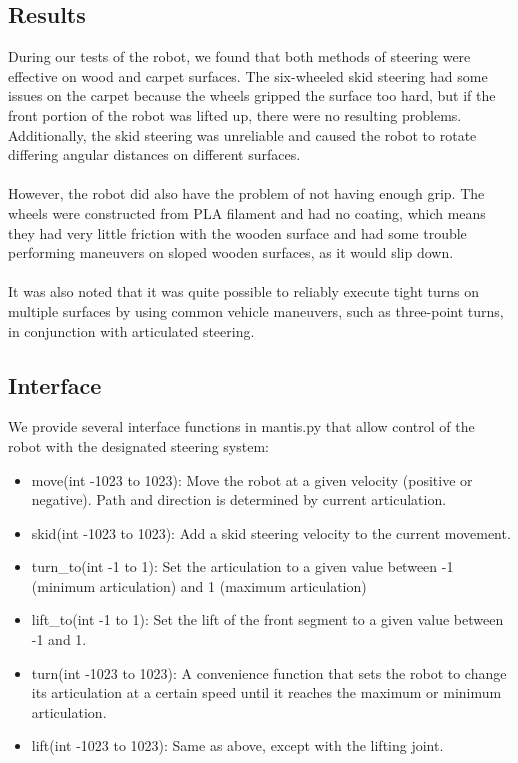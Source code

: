 \documentclass[]{article}
\begin{document}
\subsection{Results}
During our tests of the robot, we found that both methods of steering were effective on wood and carpet surfaces. The six-wheeled skid steering had some issues on the carpet because the wheels gripped the surface too hard, but if the front portion of the robot was lifted up, there were no resulting problems. Additionally, the skid steering was unreliable and caused the robot to rotate differing angular distances on different surfaces.
\\
\\
However, the robot did also have the problem of not having enough grip. The wheels were constructed from PLA filament and had no coating, which means they had very little friction with the wooden surface and had some trouble performing maneuvers on sloped wooden surfaces, as it would slip down.
\\
\\
It was also noted that it was quite possible to reliably execute tight turns on multiple surfaces by using common vehicle maneuvers, such as three-point turns, in conjunction with articulated steering.

\subsection{Interface}
We provide several interface functions in mantis.py that allow control of the robot with the designated steering system:
\begin{itemize}
    \item move(int -1023 to 1023): Move the robot at a given velocity (positive or negative). Path and direction is determined by current articulation.
    \item skid(int -1023 to 1023): Add a skid steering velocity to the current movement.
    \item turn\_to(int -1 to 1): Set the articulation to a given value between -1 (minimum articulation) and 1 (maximum articulation)
    \item lift\_to(int -1 to 1): Set the lift of the front segment to a given value between -1 and 1.
    \item turn(int -1023 to 1023): A convenience function that sets the robot to change its articulation at a certain speed until it reaches the maximum or minimum articulation.
    \item lift(int -1023 to 1023): Same as above, except with the lifting joint.
\end{itemize}
\end{document}
